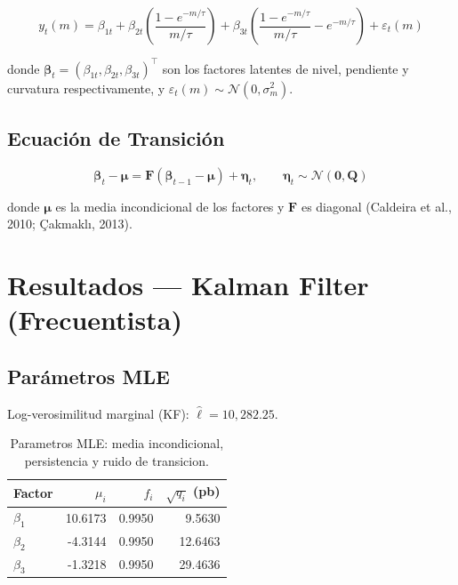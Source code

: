 \documentclass[11pt, a4paper]{article}
\begin{document}
\begin{equation}
y_t(m) = \beta_{1t} + \beta_{2t}\left(\frac{1-e^{-m/\tau}}{m/\tau}\right)+ \beta_{3t}\left(\frac{1-e^{-m/\tau}}{m/\tau}- e^{-m/\tau}\right) + \varepsilon_t(m)
\end{equation}

donde $\boldsymbol{\beta}_t = (\beta_{1t}, \beta_{2t}, \beta_{3t})^\top$
son los factores latentes de nivel, pendiente y curvatura respectivamente,
y $\varepsilon_t(m) \sim \mathcal{N}(0, \sigma^2_m)$.

\subsection{Ecuaci\'on de Transici\'on}

\begin{equation}
\boldsymbol{\beta}_t - \boldsymbol{\mu} =
\mathbf{F}(\boldsymbol{\beta}_{t-1} - \boldsymbol{\mu}) + \boldsymbol{\eta}_t,
\qquad \boldsymbol{\eta}_t \sim \mathcal{N}(\mathbf{0}, \mathbf{Q})
\end{equation}

donde $\boldsymbol{\mu}$ es la media incondicional de los factores y
$\mathbf{F}$ es diagonal (Caldeira et al., 2010; \c{C}akmaklı, 2013).
\section{Resultados --- Kalman Filter (Frecuentista)}


    \subsection{Par\'ametros MLE}

    Log-verosimilitud marginal (KF): $\hat{\ell} = 10,282.25$.

    \begin{table}[htbp]
\centering
\small
\caption{Parametros MLE: media incondicional, persistencia y ruido de transicion.}
\label{tab:mle_params}
\begin{tabular}{lrrr}
\toprule
Factor & $\mu_i$ & $f_i$ & $\sqrt{q_i}$ (pb) \\
\midrule
$\beta_1$ & 10.6173 & 0.9950 & 9.5630 \\
$\beta_2$ & -4.3144 & 0.9950 & 12.6463 \\
$\beta_3$ & -1.3218 & 0.9950 & 29.4636 \\
\bottomrule
\end{tabular}
\end{table}
\end{document}
